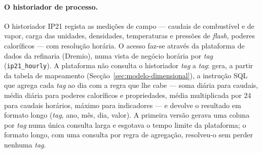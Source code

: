 \paragraph{O historiador de processo.} O historiador IP21 regista as
medições de campo --- caudais de combustível e de vapor, carga das
unidades, densidades, temperaturas e pressões de \emph{flash}, poderes
caloríficos --- com resolução horária. O acesso faz-se através da
plataforma de dados da refinaria (Dremio), numa vista de negócio horária
por \emph{tag} (\texttt{ip21\_hourly}). A plataforma não consulta o
historiador \emph{tag} a \emph{tag}: gera, a partir da tabela de mapeamento
(Secção~\ref{sec:modelo-dimensional}), a instrução SQL que agrega cada
\emph{tag} ao dia com a regra que lhe cabe --- soma diária para caudais,
média diária para poderes caloríficos e propriedades, média multiplicada
por 24 para caudais horários, máximo para indicadores --- e devolve o
resultado em formato longo (\emph{tag}, ano, mês, dia, valor). A primeira
versão gerava uma coluna por \emph{tag} numa única consulta larga e
esgotava o tempo limite da plataforma; o formato longo, com uma consulta
por regra de agregação, resolveu-o sem perder nenhuma \emph{tag}.


